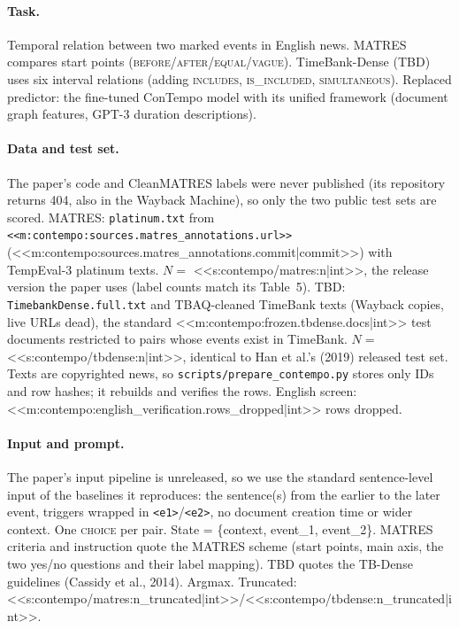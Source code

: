 \paragraph{Task.} Temporal relation between two marked events in English news. MATRES compares start points
(\textsc{before}/\textsc{after}/\textsc{equal}/\textsc{vague}). TimeBank-Dense (TBD) uses six interval relations
(adding \textsc{includes}, \textsc{is\_included}, \textsc{simultaneous}). Replaced predictor: the fine-tuned
ConTempo model with its unified framework (document graph features, GPT-3 duration descriptions).

\paragraph{Data and test set.} The paper's code and CleanMATRES labels were never published (its repository
returns 404, also in the Wayback Machine), so only the two public test sets are scored. MATRES: \texttt{platinum.txt}
from \texttt{<<m:contempo:sources.matres_annotations.url>>} (<<m:contempo:sources.matres_annotations.commit|commit>>)
with TempEval-3 platinum texts. $N=$ <<s:contempo/matres:n|int>>, the release version the paper uses (label counts
match its Table~5). TBD: \texttt{TimebankDense.full.txt} and TBAQ-cleaned TimeBank texts (Wayback copies, live URLs
dead), the standard <<m:contempo:frozen.tbdense.docs|int>> test documents restricted to pairs whose events exist in TimeBank. $N=$
<<s:contempo/tbdense:n|int>>, identical to Han et al.'s (2019) released test set. Texts are copyrighted news, so
\texttt{scripts/prepare\_contempo.py} stores only IDs and row hashes; it rebuilds and verifies the rows. English
screen: <<m:contempo:english_verification.rows_dropped|int>> rows dropped.

\paragraph{Input and prompt.} The paper's input pipeline is unreleased, so we use the standard sentence-level input
of the baselines it reproduces: the sentence(s) from the earlier to the later event, triggers wrapped in
\texttt{<e1>}/\texttt{<e2>}, no document creation time or wider context. One \textsc{choice} per pair. State =
\{context, event\_1, event\_2\}. MATRES criteria and instruction quote the MATRES scheme (start points, main axis,
the two yes/no questions and their label mapping). TBD quotes the TB-Dense guidelines (Cassidy et al., 2014). Argmax. Truncated:
<<s:contempo/matres:n_truncated|int>>/<<s:contempo/tbdense:n_truncated|int>>.

